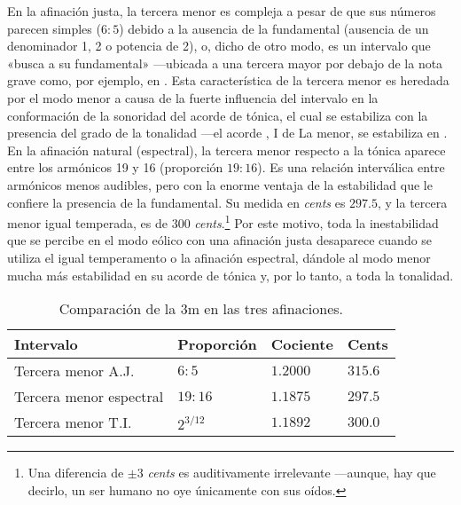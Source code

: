 \documentclass[a4paper,10pt]{article}
\begin{document}
\begin{multicols}{2}
  En la afinación justa, la tercera menor es compleja a pesar de que sus números parecen simples ($6:5$) debido a la ausencia de la fundamental (ausencia de un denominador 1, 2 o potencia de 2), o, dicho de otro modo, es un intervalo que «busca a su fundamental» ---ubicada a una tercera mayor por debajo de la nota grave como, por ejemplo,  en \hbox{.} Esta característica de la tercera menor es heredada por el modo menor a causa de la fuerte influencia del intervalo en la conformación de la sonoridad del acorde de tónica, el cual se estabiliza con la presencia del  grado de la tonalidad ---el acorde , I de La menor, se estabiliza en \hbox{.} En la afinación natural (espectral), la tercera menor respecto a la tónica aparece entre los armónicos 19 y 16 (proporción $19:16$). Es una relación interválica entre armónicos menos audibles, pero con la enorme ventaja de la estabilidad que le confiere la presencia de la fundamental. Su medida en \emph{cents} es $297.5$, y la tercera menor igual temperada, es de $300$ \emph{cents}.\footnote{Una diferencia de $\pm3$ \emph{cents} es auditivamente irrelevante ---aunque, hay que decirlo, un ser humano no oye únicamente con sus oídos.} Por este motivo, toda la inestabilidad que se percibe en el modo eólico con una afinación justa desaparece cuando se utiliza el igual temperamento o la afinación espectral, dándole al modo menor mucha más estabilidad en su acorde de tónica y, por lo tanto, a toda la tonalidad.
\end{multicols}

\begin{table}[ht]
  \centering
  \caption{Comparación de la 3m en las tres afinaciones.}\label{tab:3m}
  \begin{tabular}{@{}llll@{}}
  \toprule
  Intervalo               & Proporción  & Cociente & Cents   \\ \midrule
  Tercera menor A.J.      & $6:5$       & $1.2000$ & $315.6$ \\
  Tercera menor espectral & $19:16$     & $1.1875$ & $297.5$ \\
  Tercera menor T.I.      & $2^{3/12}$  & $1.1892$ & $300.0$ \\ \bottomrule
  \end{tabular}
\end{table}
\end{document}
